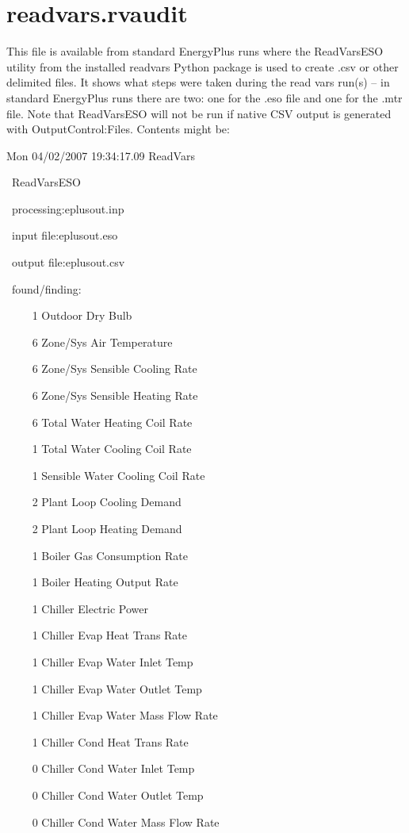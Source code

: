 \section{readvars.rvaudit}\label{readvars.rvaudit}

This file is available from standard EnergyPlus runs where the ReadVarsESO utility from the installed readvars Python package is used to create .csv or other delimited files. It shows what steps were taken during the read vars run(s) -- in standard EnergyPlus runs there are two: one for the .eso file and one for the .mtr file. Note that ReadVarsESO will not be run if native CSV output is generated with OutputControl:Files. Contents might be:

Mon 04/02/2007 19:34:17.09 ReadVars

~ReadVarsESO

~processing:eplusout.inp

~input file:eplusout.eso

~output file:eplusout.csv

~found/finding:

~~~~ 1 Outdoor Dry Bulb

~~~~ 6 Zone/Sys Air Temperature

~~~~ 6 Zone/Sys Sensible Cooling Rate

~~~~ 6 Zone/Sys Sensible Heating Rate

~~~~ 6 Total Water Heating Coil Rate

~~~~ 1 Total Water Cooling Coil Rate

~~~~ 1 Sensible Water Cooling Coil Rate

~~~~ 2 Plant Loop Cooling Demand

~~~~ 2 Plant Loop Heating Demand

~~~~ 1 Boiler Gas Consumption Rate

~~~~ 1 Boiler Heating Output Rate

~~~~ 1 Chiller Electric Power

~~~~ 1 Chiller Evap Heat Trans Rate

~~~~ 1 Chiller Evap Water Inlet Temp

~~~~ 1 Chiller Evap Water Outlet Temp

~~~~ 1 Chiller Evap Water Mass Flow Rate

~~~~ 1 Chiller Cond Heat Trans Rate

~~~~ 0 Chiller Cond Water Inlet Temp

~~~~ 0 Chiller Cond Water Outlet Temp

~~~~ 0 Chiller Cond Water Mass Flow Rate

